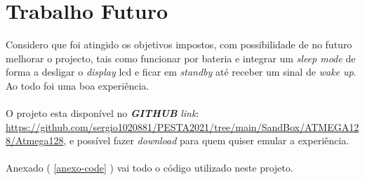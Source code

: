 \section{Trabalho Futuro}
Considero que foi atingido os objetivos impostos, com possibilidade de no futuro melhorar o projecto, tais como funcionar por bateria e integrar um \textit{sleep mode} de forma a desligar o \textit{display} \acs{lcd} e ficar em \textit{standby} até receber um sinal de \textit{wake up}. Ao todo foi uma boa experiência.
\\
\\
O projeto esta disponível no \textit{\textbf{GITHUB}} \textit{link}: \url{https://github.com/sergio1020881/PESTA2021/tree/main/SandBox/ATMEGA128/Atmega128}, e possível fazer \textit{download} para quem quiser emular a experiência.
\\
\\
Anexado ( \ref{anexo-code} )
vai todo o código utilizado neste projeto.
\begin{comment}
Sensitivity,Long-Term Drift e Temperature Effects (Span temperature hysteresis).
\end{comment}
